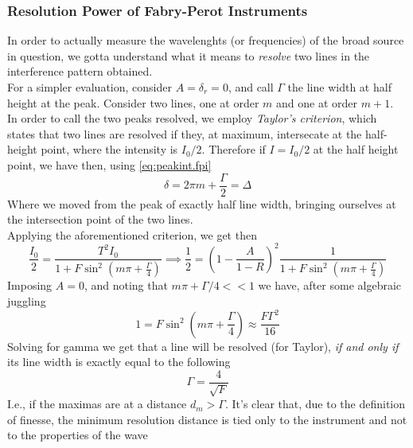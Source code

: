 \documentclass[../electromagnetism.tex]{subfiles}
\begin{document}
\subsubsection{Resolution Power of Fabry-Perot Instruments}
In order to actually measure the wavelenghts (or frequencies) of the broad source in question, we gotta understand what it means to \textit{resolve} two lines in the interference pattern obtained.\\
For a simpler evaluation, consider $A=\delta_r=0$, and call $\Gamma$ the line width at half height at the peak. Consider two lines, one at order $m$ and one at order $m+1$.\\
In order to call the two peaks resolved, we employ \textit{Taylor's criterion}, which states that two lines are resolved if they, at maximum, intersecate at the half-height point, where the intensity is $I_0/2$. Therefore if $I=I_0/2$ at the half height point, we have then, using \eqref{eq:peakint.fpi}
\begin{equation*}
	\delta=2\pi m+\frac{\Gamma}{2}=\Delta
\end{equation*}
Where we moved from the peak of exactly half line width, bringing ourselves at the intersection point of the two lines.\\
Applying the aforementioned criterion, we get then
\begin{equation*}
	\frac{I_0}{2}=\frac{T^2I_0}{1+F\sin^2\left( m\pi+\frac{\Gamma}{4} \right)}\implies\frac{1}{2}=\left( 1-\frac{A}{1-R} \right)^2\frac{1}{1+F\sin^2\left( m\pi+\frac{\Gamma}{4} \right)}
\end{equation*}
Imposing $A=0$, and noting that $m\pi+\Gamma/4<<1$ we have, after some algebraic juggling
\begin{equation*}
	1=F\sin^2\left( m\pi+\frac{\Gamma}{4} \right)\approx \frac{F\Gamma^2}{16}
\end{equation*}
Solving for gamma we get that a line will be resolved (for Taylor), \textit{if and only if} its line width is exactly equal to the following
\begin{equation}
	\Gamma=\frac{4}{\sqrt{F}}
	\label{eq:linewidthres.fpi}
\end{equation}
I.e., if the maximas are at a distance $d_m>\Gamma$. It's clear that, due to the definition of finesse, the minimum resolution distance is tied only to the instrument and not to the properties of the wave
\end{document}
